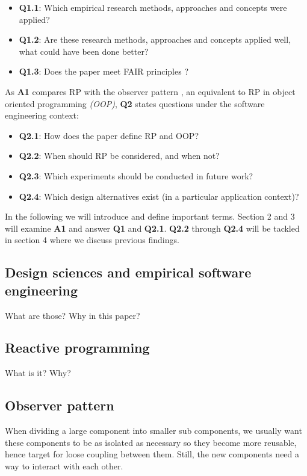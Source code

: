 \documentclass[11pt,a4paper,twocolumn]{article}
\begin{document}
	\begin{itemize}
		\item \textbf{Q1.1}: Which empirical research methods, approaches and concepts were applied?
		\item \textbf{Q1.2}: Are these research methods, approaches and concepts applied well, what could have been done better?
		\item \textbf{Q1.3}: Does the paper meet FAIR principles \cite{2019arXiv190805986H} \cite{wilkinson:2016}?
	\end{itemize}

	As \textbf{A1} compares RP with the observer pattern \cite{gamma1995design}, an equivalent to RP in object oriented programming \emph{(OOP)}, \textbf{Q2} states questions under the software engineering context:

	\begin{itemize}
		\item \textbf{Q2.1}: How does the paper define RP and OOP?
		\item \textbf{Q2.2}: When should RP be considered, and when not?
		\item \textbf{Q2.3}: Which experiments should be conducted in future work?
		\item \textbf{Q2.4}: Which design alternatives exist (in a particular application context)?
	\end{itemize}

	In the following we will introduce and define important terms. Section 2 and 3 will examine \textbf{A1} and answer \textbf{Q1} and \textbf{Q2.1}. \textbf{Q2.2} through \textbf{Q2.4} will be tackled in section 4 where we discuss previous findings.

	\subsection{Design sciences and empirical software engineering}
	What are those? Why in this paper?

	\subsection{Reactive programming}
	What is it? Why?

	\subsection{Observer pattern}
	When dividing a large component into smaller sub components, we usually want these components to be as isolated as necessary so they become more reusable, hence target for loose coupling between them. Still, the new components need a way to interact with each other.
\end{document}
